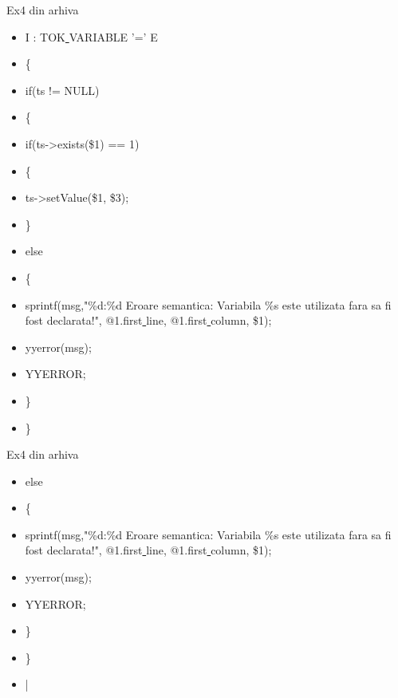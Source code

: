 \documentclass[pdf]{beamer}
\begin{document}
\begin{frame}{Ex4 din arhiva}
\begin{itemize}
\item
I : TOK\underline{ }VARIABLE '=' E
\item \hspace{4mm}
      \{
\item \hspace{6mm}
	if(ts != NULL)
\item \hspace{6mm}
	\{
\item \hspace{8mm}
	  if(ts->exists(\$1) == 1)
\item \hspace{8mm}
	  \{
\item \hspace{10mm}
	    ts->setValue(\$1, \$3);
\item \hspace{8mm}
	  \}
\item \hspace{8mm}
	  else
\item \hspace{8mm}
	  \{
\item \hspace{10mm}
	    sprintf(msg,"\%d:\%d Eroare semantica: Variabila \%s este utilizata fara sa fi fost declarata!", @1.first\underline{ }line, @1.first\underline{ }column, \$1);
\item \hspace{10mm}
	    yyerror(msg);
\item \hspace{10mm}
	    YYERROR;
\item \hspace{8mm}
	  \}
\item \hspace{6mm}
	\}
\end{itemize}
\end{frame}



\begin{frame}{Ex4 din arhiva}
\begin{itemize}
\item
else
\item \hspace{4mm}
\{
\item \hspace{6mm}
	  sprintf(msg,"\%d:\%d Eroare semantica: Variabila \%s este utilizata fara sa fi fost declarata!", @1.first\underline{ }line, @1.first\underline{ }column, \$1);
\item \hspace{6mm}
	  yyerror(msg);
\item \hspace{6mm}
	  YYERROR;
\item \hspace{4mm}
	\}
\item \hspace{5mm}	
      \}
\item \hspace{4mm}
    |
\end{itemize}
\end{frame}
\end{document}

